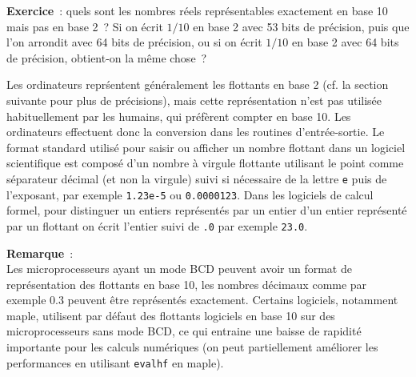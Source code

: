 \documentclass[a4paper,11pt]{article}
\begin{document}
{\bf Exercice}~: quels sont les nombres r\'eels repr\'esentables exactement
en base 10 mais pas en base 2~?
Si on écrit $1/10$ en base 2 avec 53 bits de précision, puis que
l'on arrondit avec 64 bits de précision, ou si on écrit $1/10$ en
base 2 avec 64 bits de précision, obtient-on la même chose~?

Les ordinateurs repr\'sentent g\'en\'eralement les flottants en base 2 
(cf. la section suivante pour
plus de pr\'ecisions), mais cette repr\'esentation n'est pas utilis\'ee
habituellement par les humains, qui pr\'ef\`erent compter
en base 10. Les ordinateurs effectuent donc la conversion dans
les routines d'entr\'ee-sortie. Le format standard utilis\'e
pour saisir ou afficher un nombre flottant dans un logiciel
scientifique est compos\'e d'un nombre \`a virgule
flottante utilisant le point comme s\'eparateur d\'ecimal (et
non la virgule) suivi si n\'ecessaire de la lettre \verb|e| puis de l'exposant,
par exemple \verb|1.23e-5| ou \verb|0.0000123|. Dans les
logiciels de calcul formel, pour distinguer un entiers
repr\'esent\'es par un entier
d'un entier repr\'esent\'e par un flottant on \'ecrit
l'entier suivi de \verb|.0| par exemple \verb|23.0|.

{\bf Remarque}~:\\
Les microprocesseurs ayant un mode BCD peuvent avoir un format
de repr\'esentation des flottants en base 10, les nombres d\'ecimaux
comme par exemple 0.3 peuvent \^etre repr\'esent\'es exactement. 
Certains logiciels, notamment maple, utilisent par d\'efaut des
flottants logiciels en base 10 sur des microprocesseurs sans mode BCD, 
ce qui entraine une baisse de
rapidit\'e importante pour les calculs num\'eriques (on peut
partiellement am\'eliorer les performances en utilisant \verb|evalhf|
en maple).
\end{document}
